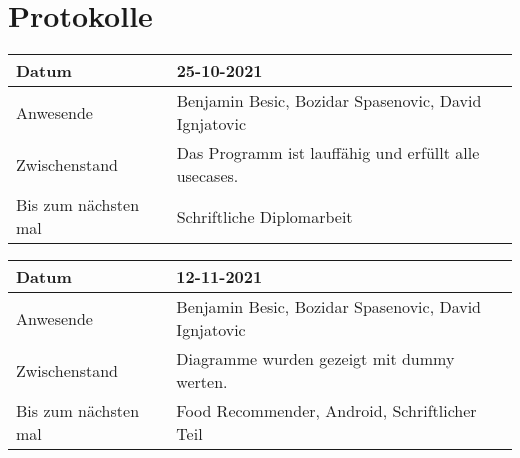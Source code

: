 \section{Protokolle}
\begin{center}
    \begin{tabular}{|p{3cm}|p{10cm}|  }
        \hline
        Datum & 25-10-2021\\
        \hline
        Anwesende & Benjamin Besic, Bozidar Spasenovic, David Ignjatovic\\
        \hline
        Zwischenstand&  Das Programm ist lauffähig und erfüllt alle usecases. \\
        \hline
        Bis zum nächsten mal &  Schriftliche Diplomarbeit\\
        \hline
    \end{tabular}
\end{center}




\begin{center}
    \begin{tabular}{ |p{3cm}|p{10cm}|   }
        \hline
        Datum & 12-11-2021\\
        \hline
        Anwesende & Benjamin Besic, Bozidar Spasenovic, David Ignjatovic\\
        \hline
        Zwischenstand& Diagramme wurden gezeigt mit dummy werten.\\
        \hline
        Bis zum nächsten mal &  Food Recommender, Android, Schriftlicher Teil \\
        \hline
    \end{tabular}
\end{center}


